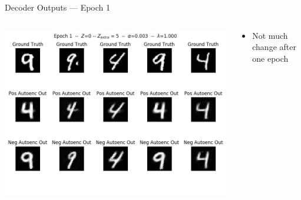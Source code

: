 \documentclass[11pt,dvipsnames,usenames,aspectratio=169]{beamer}  %
\newcommand{\red}[1]{{\color{red} #1}}
\begin{document}
\begin{frame}{Decoder Outputs --- Epoch \red{1}}
  \begin{columns}
    \begin{column}{0.59\textwidth}
      \begin{center}
        \includegraphics[scale=0.44]{deep-pu_epoch=001.jpg}
      \end{center}
    \end{column}
    \begin{column}{0.41\textwidth}
      \begin{itemize}[<+->]
        \setlength{\itemsep}{20pt}
        \item Not much change after one epoch
      \end{itemize}
    \end{column}
  \end{columns}
\end{frame}
\end{document}

